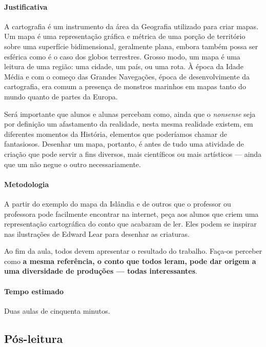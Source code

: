 \documentclass[11pt]{extarticle}
\begin{document}
\paragraph{Justificativa} A cartografia é um instrumento da área da Geografia utilizado para 
criar mapas. Um mapa é uma representação gráfica e métrica de uma porção de território sobre 
uma superfície bidimensional, geralmente plana, embora também possa ser esférica como é o caso 
dos globos terrestres. Grosso modo, um mapa é uma leitura de uma região: uma cidade, um país, 
ou uma rota. À época da Idade Média e com o começo das Grandes Navegações, época de desenvolvimente
da cartografia, era comum a presença de monstros marinhos em mapas tanto do mundo quanto de partes da Europa.


Será importante que alunos e alunas percebam como, ainda que o \emph{nonsense} seja
por definição um afastamento da realidade, nesta mesma realidade existem, em diferentes momentos
da História, elementos que poderíamos chamar de fantasiosos. Desenhar um mapa, portanto, 
é antes de tudo uma atividade de criação que pode servir a fins diversos, mais
científicos ou mais artísticos --- ainda que um não negue o outro necessariamente.

\paragraph{Metodologia} A partir do exemplo do mapa da Islândia e de outros que o professor
ou professora pode facilmente encontrar na internet, peça aos alunos que criem
uma representação cartográfica do conto que acabaram de ler. 
Eles podem se inspirar nas ilustrações de Edward Lear para desenhar as criaturas. 


Ao fim da aula, todos devem apresentar o resultado do trabalho.
Faça-os perceber como \textbf{a mesma referência, o conto que todos leram,
pode dar origem a uma diversidade de produções --- todas interessantes}.


\paragraph{Tempo estimado} Duas aulas de cinquenta minutos.


\subsection{Pós-leitura}
\end{document}
